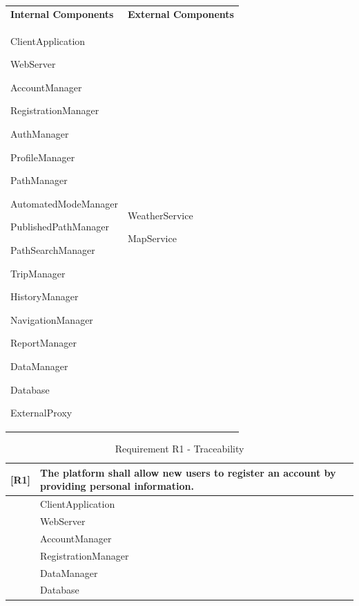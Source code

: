 \begin{tabular}{p{8cm} p{8cm}}
\textbf{\color{titleColor}Internal Components}  &  \textbf{\color{titleColor}External Components} \\
\begin{enumerate}[label={\color{titleColor}[C\arabic*]}]
    \item ClientApplication
    \item WebServer
    \item AccountManager
    \item RegistrationManager
    \item AuthManager
    \item ProfileManager
    \item PathManager
    \item AutomatedModeManager
    \item PublishedPathManager
    \item PathSearchManager
    \item TripManager
    \item HistoryManager
    \item NavigationManager
    \item ReportManager
    \item DataManager
    \item Database
    \item ExternalProxy
\end{enumerate}
     & 
\begin{enumerate}[label={\color{titleColor}[E\arabic*]}]
    \item WeatherService
    \item MapService
\end{enumerate}
\end{tabular}

\newpage

\begin{table}[H]
    \centering
    \begin{tabular}{|p{1cm}|p{14cm}|}
    \hline
    \textbf{[R1]} & \textbf{The platform shall allow new users to register an account by providing personal information.} \\ \hline
    [C1] & ClientApplication \\ \hline
    [C2] & WebServer \\ \hline
    [C3] & AccountManager \\ \hline
    [C4] & RegistrationManager \\ \hline
    [C15] & DataManager\\ \hline
    [C16] & Database\\ \hline
    \end{tabular}
    \caption{Requirement R1 - Traceability}
    \label{tab:RT1}
\end{table}

